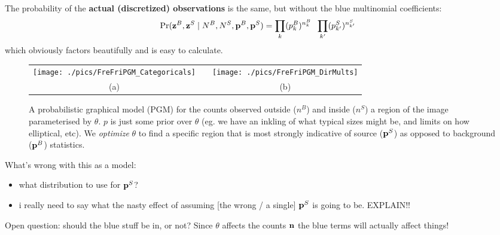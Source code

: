 \documentclass[12pt]{article}
\begin{document}
The probability of the {\bf actual (discretized) observations} is the same, but without the {\color{blue}blue} multinomial coefficients:
\begin{align}
  \Pr(\mathbf{z}^B, \mathbf{z}^S\mid N^B,N^S,\mathbf{p}^B,\mathbf{p}^S) &=  \prod_k (p^B_k)^{n^B_k} \;\; \prod_{k^\prime} (p^S_{k^\prime})^{n^S_{k^\prime}}  
\end{align}
which obviously factors beautifully and is easy to calculate.

\begin{figure}
  \begin{tabular}[c]{ccc}
\texttt{[image: ./pics/FreFriPGM\_Categoricals]} & \hspace{2cm} &
\texttt{[image: ./pics/FreFriPGM\_DirMults]} \\
(a)& & (b)
  \end{tabular}
\caption{A probabilistic graphical model (PGM) for the counts observed
  outside ($n^B$) and inside ($n^S$) a region of the image
  parameterised by $\theta$. $p$ is just some prior over $\theta$
  (eg. we have an inkling of what typical sizes might be, and limits
  on how elliptical, etc).  We {\it optimize} $\theta$ to find a
  specific region that is most strongly indicative of source ($\mathbf{p}^S$)
  as opposed to background ($\mathbf{p}^B$) statistics.
  \label{fig:FreFriPGM_Categoricals} 
}
\end{figure}


{\sc What's wrong with this as a model:}
\begin{itemize}
\item what distribution to use for $\mathbf{p}^S$?
\item i really need to say what the nasty effect of assuming [the wrong / a single] $\mathbf{p}^S$ is going to be. EXPLAIN!!
\end{itemize}

Open question: should the blue stuff be in, or not? Since $\theta$ affects the counts $\mathbf{n}$ the blue terms will actually affect things!
\end{document}
